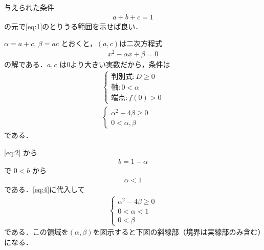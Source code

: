 \documentclass[../../main.tex]{subfiles}
\begin{document}
与えられた条件
\begin{align}
  a + b + c = 1 \label{eq:2}
\end{align}
の元で\cref{eq:1}のとりうる範囲を示せば良い．

$\alpha = a+c$, $\beta = ac$ とおくと，$(a,c)$は二次方程式
\begin{align}
  x^2 - \alpha x + \beta = 0 \label{eq:3}
\end{align}
の解である．$a, c$ は0より大きい実数だから，条件は
\begin{align}
  \begin{cases}
    \text{判別式}: D \ge 0 \\
    \text{軸}:  0 < \alpha \\
    \text{端点}: f(0) > 0
  \end{cases} \\
  \begin{cases}
    \alpha^2 - 4\beta \ge 0 \\
    0 < \alpha, \beta
  \end{cases} \label{eq:4}
\end{align}
である．

\cref{eq:2} から
\begin{align}
  b = 1 - \alpha \label{eq:5}
\end{align}
で $0 < b$ から
\begin{align}
  \alpha < 1 \label{eq:6}
\end{align}
である．\cref{eq:4}に代入して
\begin{align}
  \begin{cases}
    \alpha^2 - 4\beta \ge 0 \\
    0 < \alpha < 1 \\
    0 < \beta
  \end{cases} \label{eq:7}
\end{align}
である．この領域を$(\alpha,\beta)$を図示すると下図の斜線部（境界は実線部のみ含む）になる．
\end{document}
